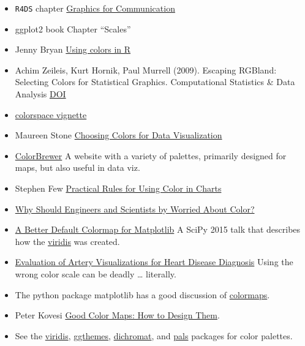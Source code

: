 \documentclass[]{book}
\providecommand{\tightlist}{%
  \setlength{\itemsep}{0pt}\setlength{\parskip}{0pt}}
\theoremstyle{definition}
\theoremstyle{definition}
\theoremstyle{definition}
\theoremstyle{remark}
\begin{document}
\begin{itemize}
\tightlist
\item
  \texttt{R4DS} chapter
  \href{http://r4ds.had.co.nz/graphics-for-communication.html\#replacing-a-scale}{Graphics
  for Communication}
\item
  ggplot2 book Chapter ``Scales''
\item
  Jenny Bryan
  \href{https://www.stat.ubc.ca/~jenny/STAT545A/block14_colors.html}{Using
  colors in R}
\item
  Achim Zeileis, Kurt Hornik, Paul Murrell (2009). Escaping RGBland:
  Selecting Colors for Statistical Graphics. Computational Statistics \&
  Data Analysis \href{http://dx.doi.org/10.1016/j.csda.2008.11.033}{DOI}
\item
  \href{https://cran.r-project.org/web/packages/colorspace/vignettes/hcl-colors.pdf}{colorspace
  vignette}
\item
  Maureen Stone
  \href{https://www.perceptualedge.com/articles/b-eye/choosing_colors.pdf}{Choosing
  Colors for Data Visualization}
\item
  \href{http://colorbrewer2.org}{ColorBrewer} A website with a variety
  of palettes, primarily designed for maps, but also useful in data viz.
\item
  Stephen Few
  \href{http://www.perceptualedge.com/articles/visual_business_intelligence/rules_for_using_color.pdf}{Practical
  Rules for Using Color in Charts}
\item
  \href{http://www.research.ibm.com/people/l/lloydt/color/color.HTM}{Why
  Should Engineers and Scientists by Worried About Color?}
\item
  \href{https://www.youtube.com/watch?v=xAoljeRJ3lU}{A Better Default
  Colormap for Matplotlib} A SciPy 2015 talk that describes how the
  \href{https://cran.r-project.org/package=viridis}{viridis} was
  created.
\item
  \href{http://www.eecs.harvard.edu/~kgajos/papers/2011/borkin11-infoviz.pdf}{Evaluation
  of Artery Visualizations for Heart Disease Diagnosis} Using the wrong
  color scale can be deadly \ldots{} literally.
\item
  The python package matplotlib has a good discussion of
  \href{http://matplotlib.org/users/colormaps.html}{colormaps}.
\item
  Peter Kovesi \href{https://arxiv.org/pdf/1509.03700v1.pdf}{Good Color
  Maps: How to Design Them}.
\item
  See the \href{https://cran.r-project.org/package=viridis}{viridis},
  \href{https://cran.r-project.org/package=ggthemes}{ggthemes},
  \href{https://cran.r-project.org/package=dichromat}{dichromat}, and
  \href{https://cran.r-project.org/package=pals}{pals} packages for
  color palettes.
\end{itemize}
\end{document}
